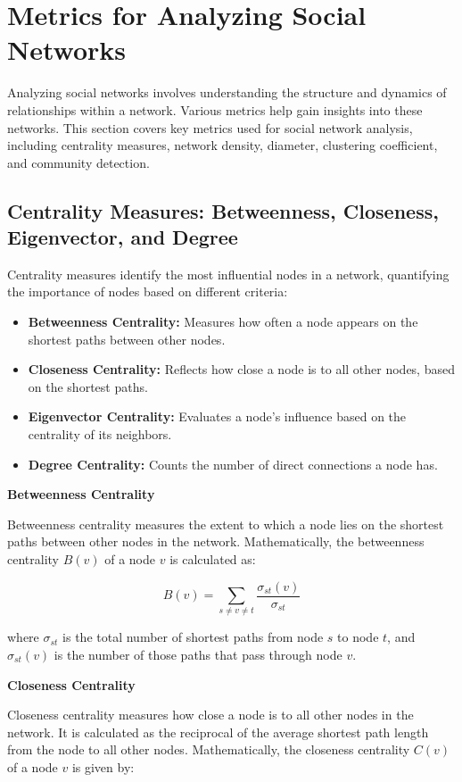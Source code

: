 \documentclass[12pt]{book} %
\begin{document}
\section{Metrics for Analyzing Social Networks}

Analyzing social networks involves understanding the structure and dynamics of relationships within a network. Various metrics help gain insights into these networks. This section covers key metrics used for social network analysis, including centrality measures, network density, diameter, clustering coefficient, and community detection.

\subsection{Centrality Measures: Betweenness, Closeness, Eigenvector, and Degree}

Centrality measures identify the most influential nodes in a network, quantifying the importance of nodes based on different criteria:

\begin{itemize}
    \item \textbf{Betweenness Centrality:} Measures how often a node appears on the shortest paths between other nodes.
    \item \textbf{Closeness Centrality:} Reflects how close a node is to all other nodes, based on the shortest paths.
    \item \textbf{Eigenvector Centrality:} Evaluates a node's influence based on the centrality of its neighbors.
    \item \textbf{Degree Centrality:} Counts the number of direct connections a node has.
\end{itemize}

\textbf{Betweenness Centrality}

Betweenness centrality measures the extent to which a node lies on the shortest paths between other nodes in the network. Mathematically, the betweenness centrality \(B(v)\) of a node \(v\) is calculated as:

\[ B(v) = \sum_{s \neq v \neq t} \frac{\sigma_{st}(v)}{\sigma_{st}} \]

where \(\sigma_{st}\) is the total number of shortest paths from node \(s\) to node \(t\), and \(\sigma_{st}(v)\) is the number of those paths that pass through node \(v\).

\textbf{Closeness Centrality}

Closeness centrality measures how close a node is to all other nodes in the network. It is calculated as the reciprocal of the average shortest path length from the node to all other nodes. Mathematically, the closeness centrality \(C(v)\) of a node \(v\) is given by:
\end{document}
